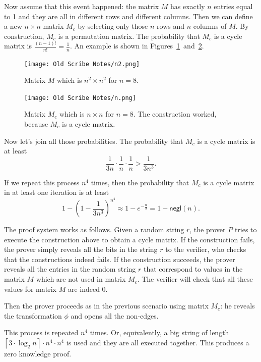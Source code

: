 \documentclass[12pt]{tufte-book}
\begin{document}
Now assume that this event happened: the matrix $M$ has exactly $n$ entries equal to 1
and they are all in different rows and different columns.
Then we can define a new $n\times n$ matrix $M_c$ by selecting only those $n$ rows
and $n$ columns of $M$. By construction, $M_c$ is a permutation matrix.
The probability that $M_c$ is a cycle matrix is $\frac{(n-1)!}{n!}=\frac{1}{n}$.
An example is shown in Figures~\ref{fig:n2}~and~\ref{fig:n}.

\begin{figure}[ht]
	\centering
		\texttt{[image: Old Scribe Notes/n2.png]}
	\caption{Matrix $M$ which is $n^2\times n^2$ for $n=8$.}
	\label{fig:n2}
\end{figure}

\begin{figure}[ht]
	\centering
		\texttt{[image: Old Scribe Notes/n.png]}
	\caption{Matrix $M_c$ which is $n\times n$ for $n=8$. The construction worked,
	         because $M_c$ is a cycle matrix.}
	\label{fig:n}
\end{figure}


Now let's join all those probabilities. The probability that $M_c$ is a cycle matrix is at least
$$\frac{1}{3n}\cdot \frac{1}{n}\cdot \frac{1}{n} > \frac{1}{3n^3}.$$

If we repeat this process $n^4$ times, then the probability that $M_c$ is a cycle matrix in at least one iteration is at least
$$1-\left(1-\frac{1}{3n^3}\right)^{n^4}\approx 1-e^{-\frac{n}{3}} = 1-\mathsf{negl}(n).$$


\bigskip
The proof system works as follows. Given a random string $r$, the prover $P$ tries
to execute the construction above to obtain a cycle matrix.
If the construction fails, the prover simply reveals all the bits in the string $r$
to the verifier, who checks that the constructions indeed fails.
If the construction succeeds, the prover reveals all the entries in the random string $r$
that correspond to values in the matrix $M$ which are not used in matrix $M_c$.
The verifier will check that all these values for matrix $M$ are indeed 0.

Then the prover proceeds as in the previous scenario using matrix $M_c$: he
reveals the transformation $\phi$ and opens all the non-edges.

This process is repeated $n^4$ times. Or, equivalently, a big string of length
$\left\lceil 3\cdot \log_2 n\right\rceil \cdot n^4\cdot n^4$ is used and they are all
executed together. This produces a zero knowledge proof.
\end{document}
